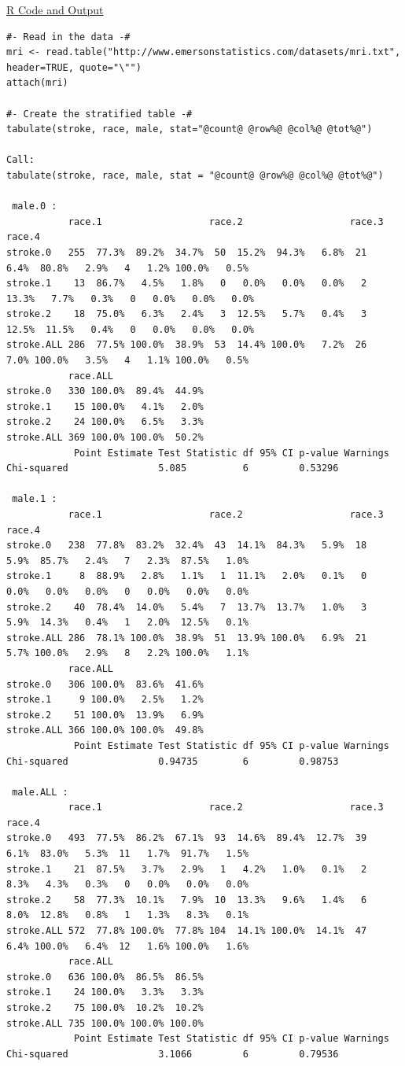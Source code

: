 \documentclass[11pt,letterpaper,fleqn]{report}
\begin{document}
\underline{R Code and Output}
{\scriptsize
\begin{verbatim}
#- Read in the data -#
mri <- read.table("http://www.emersonstatistics.com/datasets/mri.txt", header=TRUE, quote="\"")
attach(mri)

#- Create the stratified table -#
tabulate(stroke, race, male, stat="@count@ @row%@ @col%@ @tot%@")

Call:
tabulate(stroke, race, male, stat = "@count@ @row%@ @col%@ @tot%@")

 male.0 : 
           race.1                   race.2                   race.3                   race.4                  
stroke.0   255  77.3%  89.2%  34.7%  50  15.2%  94.3%   6.8%  21   6.4%  80.8%   2.9%   4   1.2% 100.0%   0.5%
stroke.1    13  86.7%   4.5%   1.8%   0   0.0%   0.0%   0.0%   2  13.3%   7.7%   0.3%   0   0.0%   0.0%   0.0%
stroke.2    18  75.0%   6.3%   2.4%   3  12.5%   5.7%   0.4%   3  12.5%  11.5%   0.4%   0   0.0%   0.0%   0.0%
stroke.ALL 286  77.5% 100.0%  38.9%  53  14.4% 100.0%   7.2%  26   7.0% 100.0%   3.5%   4   1.1% 100.0%   0.5%
           race.ALL                
stroke.0   330 100.0%  89.4%  44.9%
stroke.1    15 100.0%   4.1%   2.0%
stroke.2    24 100.0%   6.5%   3.3%
stroke.ALL 369 100.0% 100.0%  50.2%
            Point Estimate Test Statistic df 95% CI p-value Warnings
Chi-squared                5.085          6         0.53296         

 male.1 : 
           race.1                   race.2                   race.3                   race.4                  
stroke.0   238  77.8%  83.2%  32.4%  43  14.1%  84.3%   5.9%  18   5.9%  85.7%   2.4%   7   2.3%  87.5%   1.0%
stroke.1     8  88.9%   2.8%   1.1%   1  11.1%   2.0%   0.1%   0   0.0%   0.0%   0.0%   0   0.0%   0.0%   0.0%
stroke.2    40  78.4%  14.0%   5.4%   7  13.7%  13.7%   1.0%   3   5.9%  14.3%   0.4%   1   2.0%  12.5%   0.1%
stroke.ALL 286  78.1% 100.0%  38.9%  51  13.9% 100.0%   6.9%  21   5.7% 100.0%   2.9%   8   2.2% 100.0%   1.1%
           race.ALL                
stroke.0   306 100.0%  83.6%  41.6%
stroke.1     9 100.0%   2.5%   1.2%
stroke.2    51 100.0%  13.9%   6.9%
stroke.ALL 366 100.0% 100.0%  49.8%
            Point Estimate Test Statistic df 95% CI p-value Warnings
Chi-squared                0.94735        6         0.98753         

 male.ALL : 
           race.1                   race.2                   race.3                   race.4                  
stroke.0   493  77.5%  86.2%  67.1%  93  14.6%  89.4%  12.7%  39   6.1%  83.0%   5.3%  11   1.7%  91.7%   1.5%
stroke.1    21  87.5%   3.7%   2.9%   1   4.2%   1.0%   0.1%   2   8.3%   4.3%   0.3%   0   0.0%   0.0%   0.0%
stroke.2    58  77.3%  10.1%   7.9%  10  13.3%   9.6%   1.4%   6   8.0%  12.8%   0.8%   1   1.3%   8.3%   0.1%
stroke.ALL 572  77.8% 100.0%  77.8% 104  14.1% 100.0%  14.1%  47   6.4% 100.0%   6.4%  12   1.6% 100.0%   1.6%
           race.ALL                
stroke.0   636 100.0%  86.5%  86.5%
stroke.1    24 100.0%   3.3%   3.3%
stroke.2    75 100.0%  10.2%  10.2%
stroke.ALL 735 100.0% 100.0% 100.0%
            Point Estimate Test Statistic df 95% CI p-value Warnings
Chi-squared                3.1066         6         0.79536         


\end{verbatim}}
\end{document}
